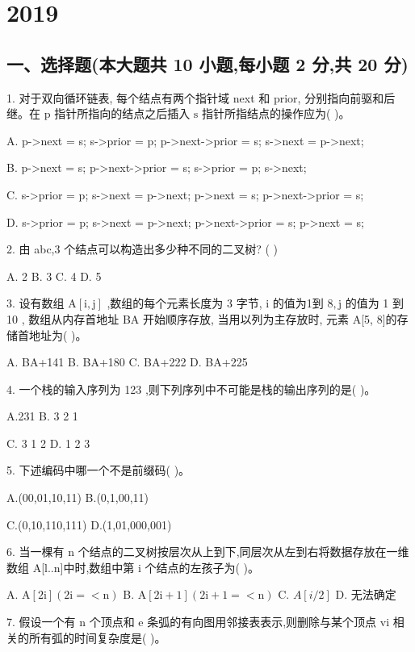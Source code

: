 \chapter{2019}
\section*{一、选择题(本大题共 10 小题,每小题 2 分,共 20 分)}

1. 对于双向循环链表, 每个结点有两个指针域 next 和 prior, 分别指向前驱和后继。在 \(\mathrm{p}\) 指针所指向的结点之后插入 \(\mathrm{s}\) 指针所指结点的操作应为(   )。

A. p->next = s; s->prior = p; p->next->prior = s; s->next = p->next;

B. p->next = s; p->next->prior = s; s->prior = p; s->next;

C. s->prior = p; s->next = p->next; p->next = s; p->next->prior = s;

D. s->prior = p; s->next = p->next; p->next->prior = s; p->next = s;

2. 由 abc,3 个结点可以构造出多少种不同的二叉树? (   )

A. 2 B. 3 C. 4 D. 5

3. 设有数组 \(\mathrm{A}\left\lbrack  {\mathrm{i},\mathrm{j}}\right\rbrack\) ,数组的每个元素长度为 3 字节, \(\mathrm{i}\) 的值为1到 \(8,\mathrm{j}\) 的值为 1 到 10 , 数组从内存首地址 BA 开始顺序存放, 当用以列为主存放时, 元素 A[5, 8]的存储首地址为(   )。

A. BA+141 B. BA+180 C. BA+222 D. BA+225

4. 一个栈的输入序列为 123 ,则下列序列中不可能是栈的输出序列的是(   )。

A.231 B. 3 2 1

C. 3 1 2 D. 1 2 3

5. 下述编码中哪一个不是前缀码(   )。

A.(00,01,10,11) B.(0,1,00,11)

C.(0,10,110,111) D.(1,01,000,001)

6. 当一棵有 n 个结点的二叉树按层次从上到下,同层次从左到右将数据存放在一维数组 A[l..n]中时,数组中第 i 个结点的左孩子为(   )。

A. \(\mathrm{A}\left\lbrack  {2\mathrm{i}}\right\rbrack  \left( {2\mathrm{i} =  < \mathrm{n}}\right)\) B. \(\mathrm{A}\left\lbrack  {2\mathrm{i} + 1}\right\rbrack  \left( {2\mathrm{i} + 1 =  < \mathrm{n}}\right)\) C. \(A\left\lbrack  {i/2}\right\rbrack\) D. 无法确定

7. 假设一个有 \(\mathrm{n}\) 个顶点和 \(\mathrm{e}\) 条弧的有向图用邻接表表示,则删除与某个顶点 vi 相关的所有弧的时间复杂度是(   )。

